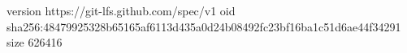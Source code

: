 version https://git-lfs.github.com/spec/v1
oid sha256:48479925328b65165af6113d435a0d24b08492fc23bf16ba1c51d6ae44f34291
size 626416
